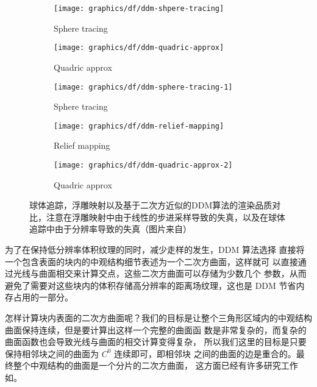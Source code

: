 \begin{figure}
\begin{fullwidth}
	\begin{subfigure}[b]{0.18\thewidth}
		\texttt{[image: graphics/df/ddm-shpere-tracing]}	
		\caption{Sphere tracing}
	\end{subfigure}
	\begin{subfigure}[b]{0.1758\thewidth}
		\texttt{[image: graphics/df/ddm-quadric-approx]}	
		\caption{Quadric approx}
	\end{subfigure}
	\begin{subfigure}[b]{0.202\thewidth}
		\texttt{[image: graphics/df/ddm-sphere-tracing-1]}	
		\caption{Sphere tracing}
	\end{subfigure}
	\begin{subfigure}[b]{0.202\thewidth}
		\texttt{[image: graphics/df/ddm-relief-mapping]}
		\caption{Relief mapping}
	\end{subfigure}
	\begin{subfigure}[b]{0.202\thewidth}
		\texttt{[image: graphics/df/ddm-quadric-approx-2]}	
		\caption{Quadric approx}
	\end{subfigure}
	\caption{球体追踪，浮雕映射以及基于二次方近似的DDM算法的渲染品质对比，注意在浮雕映射中由于线性的步进采样导致的失真，以及在球体追踪中由于分辨率导致的失真（图片来自\cite{a:directional-distance-maps}）}
	\label{f:df-ddm-comparation}
\end{fullwidth}	
\end{figure}

为了在保持低分辨率体积纹理的同时，减少走样的发生，DDM 算法选择 直接将一个包含表面的块内的中观结构细节表述为一个二次方曲面，这样就可 以直接通过光线与曲面相交来计算交点，这些二次方曲面可以存储为少数几个 参数，从而避免了需要对这些块内的体积存储高分辨率的距离场纹理，这也是 DDM 节省内存占用的一部分。

怎样计算块内表面的二次方曲面呢？我们的目标是让整个三角形区域内的中观结构曲面保持连续，但是要计算出这样一个完整的曲面函 数是非常复杂的，而复杂的曲面函数也会导致光线与曲面的相交计算变得复杂， 所以我们这里的目标是只要保持相邻块之间的曲面为 $C^{0}$ 连续即可，即相邻块 之间的曲面的边是重合的。最终整个中观结构的曲面是一个分片的二次方曲面， 这方面已经有许多研究工作如\cite{a:Asurveyofmethodsforrecoveringquadricsintrianglemeshes,a:Sparselowdegreeimplicitsurfaceswithapplicationstohighqualityrenderingfeatureextractionandsmoothing,a:Incrementalraycastingofpiecewisequadraticsurfacesonthegpu}。

